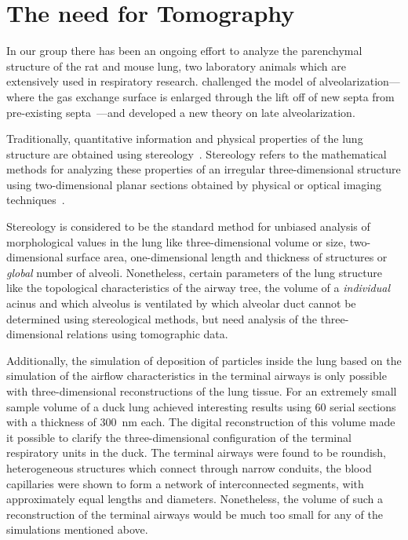 \section{The need for Tomography}
In our group there has been an ongoing effort to analyze the parenchymal structure of the rat and mouse lung, two laboratory animals which are extensively used in respiratory research. \citet{Schittny2008} challenged the model of alveolarization---where the gas exchange surface is enlarged through the lift off of new septa from pre-existing septa~\cite{Burri1974,Massaro1985}---and developed a new theory on late alveolarization.

Traditionally, quantitative information and physical properties of the lung structure are obtained using stereology~\cite{Ochs2006}. Stereology refers to the mathematical methods for analyzing these properties of an irregular three-dimensional structure using two-dimensional planar sections obtained by physical or optical imaging techniques~\cite{Hsia2010}.

Stereology is considered to be the standard method for unbiased analysis of morphological values in the lung like three-dimensional volume or size, two-dimensional surface area, one-dimensional length and thickness of structures or \emph{global} number of alveoli. Nonetheless, certain parameters of the lung structure like the topological characteristics of the airway tree, the volume of a \emph{individual} acinus and which alveolus is ventilated by which alveolar duct cannot be determined using stereological methods, but need analysis of the three-dimensional relations using tomographic data.

Additionally, the simulation of deposition of particles inside the lung based on the simulation of the airflow characteristics in the terminal airways is only possible with three-dimensional reconstructions of the lung tissue. For an extremely small sample volume of a duck lung \citet{Woodward2005} achieved interesting results using 60 serial sections with a thickness of \SI{300}{\nano\meter} each. The digital reconstruction of this volume made it possible to clarify the three-dimensional configuration of the terminal respiratory units in the duck. The terminal airways were found to be roundish, heterogeneous structures which connect through narrow conduits, the blood capillaries were shown to form a network of interconnected segments, with approximately equal lengths and diameters. Nonetheless, the volume of such a reconstruction of the terminal airways would be much too small for any of the simulations mentioned above.

